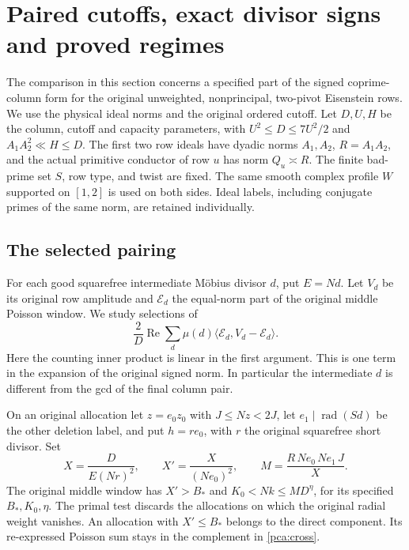 \section{Paired cutoffs, exact divisor signs and proved regimes}\label{pca:core}

The comparison in this section concerns a specified part of the signed
coprime-column form for the original unweighted, nonprincipal, two-pivot
Eisenstein rows. We use the physical ideal norms and the original ordered
cutoff. Let \(D,U,H\) be the column, cutoff and capacity parameters, with
\(U^2\le D\le 7U^2/2\) and \(A_1A_2^2\ll H\le D\). The first two row ideals have
dyadic norms \(A_1,A_2\), \(R=A_1A_2\), and the actual primitive conductor of
row \(u\) has norm \(Q_u\asymp R\). The finite bad-prime set \(S\), row type,
and twist are fixed. The same smooth complex profile \(W\) supported on
\([1,2]\) is used on both sides. Ideal labels, including conjugate primes
of the same norm, are retained individually.

\subsection{The selected pairing}\label{pca:pair}
For each good squarefree intermediate M\"obius divisor \(d\), put \(E=Nd\).
Let \(V_d\) be its original row amplitude and \(\mathcal E_d\) the
equal-norm part of the original middle Poisson window. We study selections
of
\begin{equation}\label{pca:cross}
 \frac{2}{D}\operatorname{Re}\sum_d\mu(d)
       \langle \mathcal E_d,V_d-\mathcal E_d\rangle .
\end{equation}
Here the counting inner product is linear in the first argument. This is
one term in the expansion of the original signed norm. In particular the
intermediate \(d\) is different from the gcd of the final column pair.

On an original allocation let \(z=e_0z_0\) with
\(J\le Nz<2J\), let \(e_1\mid\operatorname{rad}(Sd)\) be the other deletion
label, and put \(h=re_0\), with \(r\) the original squarefree short divisor.
Set
\[
 X=\frac{D}{E(Nr)^2},\qquad X'=\frac{X}{(Ne_0)^2},
 \qquad M=\frac{R\,Ne_0\,Ne_1\,J}{X}.
\]
The original middle window has \(X'>B_*\) and \(K_0<Nk\le M D^\eta\),
for its specified \(B_*,K_0,\eta\). The primal test discards the
allocations on which the original radial weight vanishes. An allocation
with \(X'\le B_*\) belongs to the direct component. Its re-expressed
Poisson sum stays in the complement in \eqref{pca:cross}.

